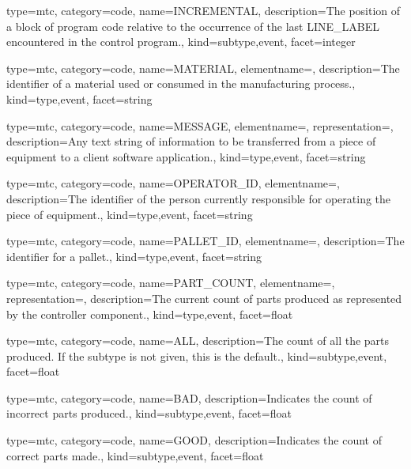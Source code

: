{
  type=mtc,
  category=code,
  name={INCREMENTAL},
  description={The position of a block of program code relative to the occurrence of the last LINE\_LABEL encountered in the control program.},
  kind={subtype,event},
  facet={\gls{integer}}
}


{
  type=mtc,
  category=code,
  name={MATERIAL},
  elementname=,
  description={The identifier of a material used or consumed in the manufacturing process.},
  kind={type,event},
  facet={\gls{string}}
}


{
  type=mtc,
  category=code,
  name={MESSAGE},
  elementname=,
  representation=,
  description={Any text string of information to be transferred from a piece of equipment to a client software application.},
  kind={type,event},
  facet={\gls{string}}
}


{
  type=mtc,
  category=code,
  name={OPERATOR\_ID},
  elementname=,
  description={The identifier of the person currently responsible for operating the piece of equipment.},
  kind={type,event},
  facet={\gls{string}}
}


{
  type=mtc,
  category=code,
  name={PALLET\_ID},
  elementname=,
  description={The identifier for a pallet.},
  kind={type,event},
  facet={\gls{string}}
}


{
  type=mtc,
  category=code,
  name={PART\_COUNT},
  elementname=,
  representation=,
  description={The current count of parts produced as represented by the \gls{controller} component.},
  kind={type,event},
  facet={\gls{float}}
}


{
  type=mtc,
  category=code,
  name={ALL},
  description={The count of all the parts produced.  If the subtype is not given, this is the default.},
  kind={subtype,event},
  facet={\gls{float}}
}


{
  type=mtc,
  category=code,
  name={BAD},
  description={Indicates the count of incorrect parts produced.},
  kind={subtype,event},
  facet={\gls{float}}
}


{
  type=mtc,
  category=code,
  name={GOOD},
  description={Indicates the count of correct parts made.},
  kind={subtype,event},
  facet={\gls{float}}
}



